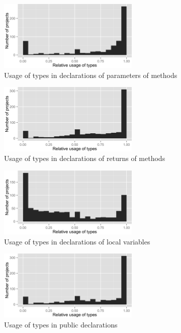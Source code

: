 \begin{figure}[h]
\centering 
\includegraphics[width=0.6\textwidth]{../aosd_2014/analysis/result/background/static-only/histograms/8_Method_Parameter.png} 
\caption{Usage of types in declarations of parameters of methods}
\end{figure}

\begin{figure}[h]
\centering 
\includegraphics[width=0.6\textwidth]{../aosd_2014/analysis/result/background/static-only/histograms/7_Method_Return.png} 
\caption{Usage of types in declarations of returns of methods}
\end{figure}

\begin{figure}[h]
\centering 
\includegraphics[width=0.6\textwidth]{../aosd_2014/analysis/result/background/static-only/histograms/6_Local_Variable.png} 
\caption{Usage of types in declarations of local variables}
\end{figure}

\begin{figure}[h]
\centering 
\includegraphics[width=0.6\textwidth]{../aosd_2014/analysis/result/background/static-only/histograms/13_Public.png} 
\caption{Usage of types in public declarations}
\end{figure}

